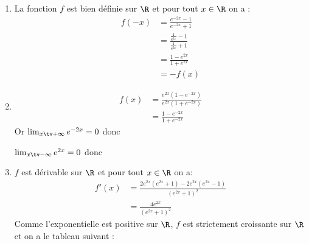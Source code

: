 \documentclass[a4paper, 11pt,reqno]{article}
\begin{document}
\begin{correction}
\begin{enumerate}
\item La fonction $f$ est bien définie sur $\R$ et 
pour tout $x\in \R$ on  a :
\begin{align*}
f(-x)&=\frac{e^{-2x}-1}{e^{-2x}+1}\\
		&=\frac{\frac{1}{e^{2x}}-1}{\frac{1}{e^{2x}}+1}\\
		&=\frac{1-e^{2x}}{1+e^{2x}}\\
		&=-f(x)
\end{align*}
\item 
\begin{align*}
f(x)& = \frac{e^{2x} (1-e^{-2x}) }{e^{2x} (1+e^{-2x})}\\
&=\frac{ 1-e^{-2x} }{1+e^{-2x}}
\end{align*}
Or $\lim_{x\tv +\infty} e^{-2x}=0$ donc

$\lim_{x\tv -\infty} e^{2x}=0$ donc

\item 
$f$ est dérivable sur $\R$ et pour tout $x\in \R$ on a:
\begin{align*}
f'(x) & = \frac{2e^{2x} (e^{2x}+1) - 2e^{2x} (e^{2x}-1) }{ (e^{2x}+1)^2}\\
&=  \frac{4e^{2x}}{ (e^{2x}+1)^2}
\end{align*}
Comme l'exponentielle est  positive sur $\R$, $f$ est strictement croissante sur $\R$ et on a le tableau suivant : 




\end{enumerate}
\end{correction}
\end{document}
